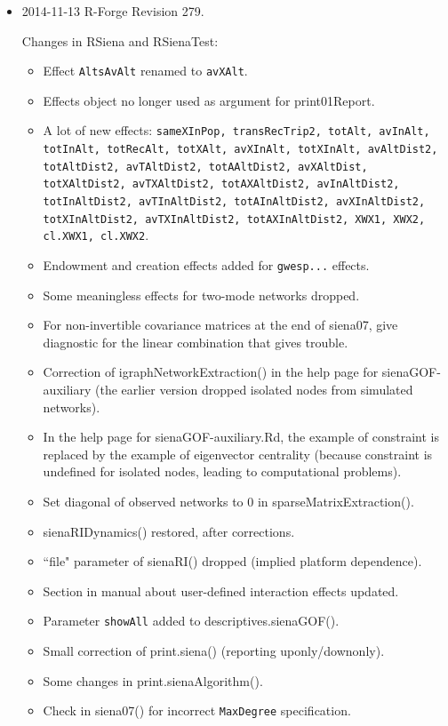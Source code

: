 \documentclass[a4paper,fleqn,11pt]{article}
\newcommand{\+}{\, + \,}
\newcommand{\sfn}[1]{\textsf{#1}}
\begin{document}
\begin{small}
\begin{itemize}
\item 2014-11-13  R-Forge Revision 279.

Changes in RSiena and RSienaTest:
\begin{itemize}
   \item Effect \texttt{AltsAvAlt} renamed to \texttt{avXAlt}.
   \item Effects object no longer used as argument for \sfn{print01Report}.
   \item A lot of new effects: \texttt{sameXInPop, transRecTrip2, totAlt, avInAlt, totInAlt,
     totRecAlt, totXAlt, avXInAlt, totXInAlt,
	 avAltDist2, totAltDist2, avTAltDist2, totAAltDist2,
	 avXAltDist, totXAltDist2, avTXAltDist2, totAXAltDist2,
	 avInAltDist2, totInAltDist2, avTInAltDist2, totAInAltDist2,
	 avXInAltDist2, totXInAltDist2, avTXInAltDist2, totAXInAltDist2,
     XWX1, XWX2, cl.XWX1, cl.XWX2}.
   \item Endowment and creation effects added for \texttt{gwesp...} effects.
   \item Some meaningless effects for two-mode networks dropped.
   \item For non-invertible covariance matrices at the end of \sfn{siena07},
         give diagnostic for the linear combination that gives trouble.
   \item Correction of \sfn{igraphNetworkExtraction()} in the help page
       for \sfn{sienaGOF-auxiliary}
     (the earlier version dropped isolated nodes from simulated networks).
   \item In the help page for \sfn{sienaGOF-auxiliary.Rd},
     the example of constraint is replaced
     by the example of eigenvector centrality (because constraint
	 is undefined for isolated nodes, leading to computational problems).
   \item Set diagonal of observed networks to 0 in \sfn{sparseMatrixExtraction()}.
   \item \sfn{sienaRIDynamics()} restored, after corrections.
   \item ``file" parameter of \sfn{sienaRI()} dropped (implied platform dependence).
   \item Section in manual about user-defined interaction effects updated.
   \item Parameter \texttt{showAll} added to \sfn{descriptives.sienaGOF()}.
   \item Small correction of \sfn{print.siena()} (reporting uponly/downonly).
   \item Some changes in \sfn{print.sienaAlgorithm()}.
   \item Check in \sfn{siena07()} for incorrect \texttt{MaxDegree} specification.

\end{itemize}
\end{itemize}
\end{small}
\end{document}
